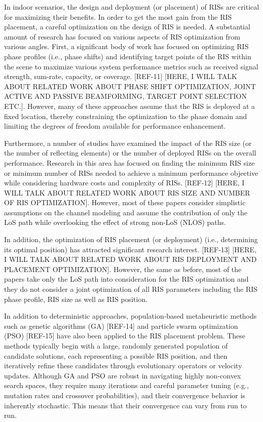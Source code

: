 \documentclass{IEEEoj}
\begin{document}
In indoor scenarios, the design and deployment (or placement) of RISs are critical for maximizing their benefits. In order to get the most gain from the RIS placement, a careful optimization on the design of RIS is needed. A substantial amount of research has focused on various aspects of RIS optimization from various angles. First, a significant body of work has focused on optimizing RIS phase profiles (i.e., phase shifts) and identifying target points of the RIS within the scene to maximize various system performance metrics such as received signal strength, sum-rate, capacity, or coverage. [REF-11] [HERE, I WILL TALK ABOUT RELATED WORK ABOUT PHASE SHIFT OPTIMIZATION, JOINT ACTIVE AND PASSIVE BEAMFORMING, TARGET POINT SELECTION ETC.]. However, many of these approaches assume that the RIS is deployed at a fixed location, thereby constraining the optimization to the phase domain and limiting the degrees of freedom available for performance enhancement.

Furthermore, a number of studies have examined the impact of the RIS size (or the number of reflecting elements) or the number of deployed RISs on the overall performance. Research in this area has focused on finding the minimum RIS size or minimum number of RISs needed to achieve a minimum performance objective while considering hardware costs and complexity of RISs. [REF-12] [HERE, I WILL TALK ABOUT RELATED WORK ABOUT RIS SIZE AND NUMBER OF RIS OPTIMIZATION]. However, most of these papers consider simplistic assumptions on the channel modeling and assume the contribution of only the LoS path while overlooking the effect of strong non-LoS (NLOS) paths.

In addition, the optimization of RIS placement (or deployment) (i.e., determining its optimal position) has attracted significant research interest. [REF-13] [HERE, I WILL TALK ABOUT RELATED WORK ABOUT RIS DEPLOYMENT AND PLACEMENT OPTIMIZATION]. However, the same as before, most of the papers take only the LoS path into consideration for the RIS optimization and they do not consider a joint optimization of all RIS parameters including the RIS phase profile, RIS size as well as RIS position.

In addition to deterministic approaches, population‐based metaheuristic methods such as genetic algorithms (GA) [REF-14] and particle swarm optimization (PSO) [REF-15] have also been applied to the RIS placement problem. These methods typically begin with a large, randomly generated population of candidate solutions, each representing a possible RIS position, and then iteratively refine these candidates through evolutionary operators or velocity updates. Although GA and PSO are robust in navigating highly non-convex search spaces, they require many iterations and careful parameter tuning (e.g., mutation rates and crossover probabilities), and their convergence behavior is inherently stochastic. This means that their convergence can vary from run to run.
\end{document}
